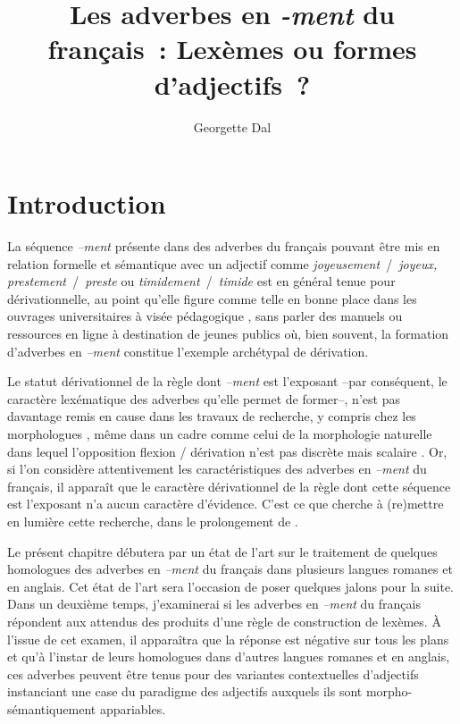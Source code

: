 \documentclass[output=paper]{langsci/langscibook}
\title{\texorpdfstring{Les adverbes en \textit{-ment} du français~: Lexèmes ou formes d'adjectifs~?}{Les adverbes en {-ment} du français~: Lexèmes ou formes d'adjectifs~?}}
\author{Georgette Dal \affiliation{Univ. Lille, CNRS, UMR 8163 - STL - Savoirs Textes Langage, F-59000 Lille, France}}
\begin{document}

\section{Introduction}

La séquence \emph{--ment} présente dans des adverbes du français pouvant être mis en relation formelle et sémantique avec un adjectif comme \emph{joyeusement~}/~\emph{joyeux, prestement~}/~\emph{preste} ou \emph{timidement~}/~\emph{timide} est en général tenue pour dérivationnelle, au point qu'elle figure comme telle en bonne place dans les ouvrages universitaires à visée pédagogique %
\citep[par exemple, ][]{Huot06,Niklas15,Gardes15}%
%
, sans parler des manuels ou ressources en ligne à destination de jeunes publics où, bien souvent, la formation d'adverbes en \emph{--ment} constitue l'exemple archétypal de dérivation.

Le statut dérivationnel de la règle dont \emph{--ment} est l'exposant --par conséquent, le caractère lexématique des adverbes qu'elle permet de former--, n'est pas davantage remis en cause dans les travaux de recherche, y compris chez les morphologues %
\citep[voir par exemple ][]{Corbin82,Corbin87,Willigen83,Bonami05,Roche10,Boye15,Detges15,Rainer16b}%
%
, même dans un cadre comme celui de la morphologie naturelle dans lequel l'opposition flexion / dérivation n'est pas discrète mais scalaire %
\citep[pour des points récents sur ce courant, cf. ][]{Dressler05,Luschutzky15}%
%
. Or, si l'on considère attentivement les caractéristiques des adverbes en \emph{--ment} du français, il apparaît que le caractère dérivationnel de la règle dont cette séquence est l'exposant n'a aucun caractère d'évidence. C'est ce que cherche à (re)mettre en lumière cette recherche, dans le prolongement de %
\citet{Dal07}%
%
.

Le présent chapitre débutera par un état de l'art sur le traitement de quelques homologues des adverbes en \emph{--ment} du français dans plusieurs langues romanes et en anglais. Cet état de l'art sera l'occasion de poser quelques jalons pour la suite. Dans un deuxième temps, j'examinerai si les adverbes en \emph{--ment} du français répondent aux attendus des produits d'une règle de construction de lexèmes. À l'issue de cet examen, il apparaîtra que la réponse est négative sur tous les plans et qu'à l'instar de leurs homologues dans d'autres langues romanes et en anglais, ces adverbes peuvent être tenus pour des variantes contextuelles d'adjectifs instanciant une case du paradigme des adjectifs auxquels ils sont morpho-sémantiquement appariables.
\end{document}
